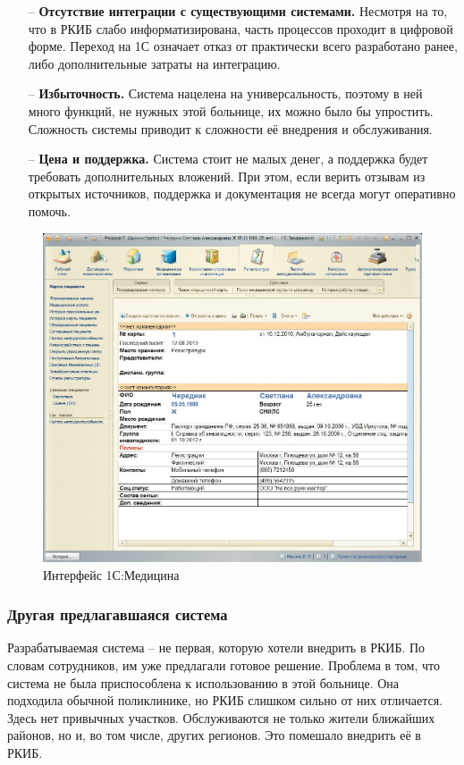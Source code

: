 \documentclass[a4paper,article]{article}
\begin{document}
\begin{sloppypar}
        \begin{itemize}[nolistsep]
            \item[--] \textbf{Отсутствие интеграции с существующими системами.} Несмотря на то, что в РКИБ слабо информатизирована, часть процессов проходит в цифровой форме. Переход на 1С означает отказ от практически всего разработано ранее, либо дополнительные затраты на интеграцию.
            \item[--] \textbf{Избыточность.} Система нацелена на универсальность, поэтому в ней много функций, не нужных этой больнице, их можно было бы упростить. Сложность системы приводит к сложности её внедрения и обслуживания.
            \item[--] \textbf{Цена и поддержка.} Система стоит не малых денег, а поддержка будет требовать дополнительных вложений. При этом, если верить отзывам из открытых источников, поддержка и документация не всегда могут оперативно помочь.
        \end{itemize}

        \begin{figure}[h]
            \centering
            \includegraphics[width=0.6\linewidth]{Интерфейс 1С:Медицина.png}
            \caption{\centering Интерфейс 1С:Медицина}
            \label{fig:Интерфейс 1С:Медицина}
        \end{figure}

    \subsubsection{Другая предлагавшаяся система}

        Разрабатываемая система -- не первая, которую хотели внедрить в РКИБ. По словам сотрудников, им уже предлагали готовое решение. Проблема в том, что система не была приспособлена к использованию в этой больнице. Она подходила обычной поликлинике, но РКИБ слишком сильно от них отличается. Здесь нет привычных участков. Обслуживаются не только жители ближайших районов, но и, во том числе, других регионов. Это помешало внедрить её в РКИБ.


\end{sloppypar}
\end{document}
